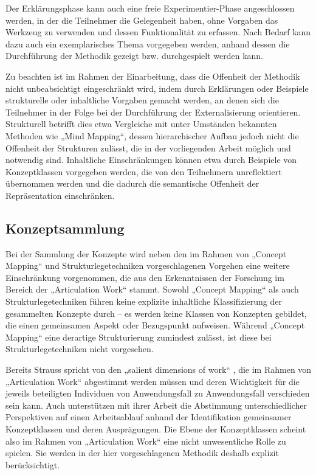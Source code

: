 Der Erklärungsphase kann auch eine freie Experimentier-Phase angeschlossen werden, in der die Teilnehmer die Gelegenheit haben, ohne Vorgaben das Werkzeug zu verwenden und dessen Funktionalität zu erfassen. Nach Bedarf kann dazu auch ein exemplarisches Thema vorgegeben werden, anhand dessen die Durchführung der Methodik gezeigt bzw. durchgespielt werden kann.

Zu beachten ist im Rahmen der Einarbeitung, dass die Offenheit der Methodik nicht unbeabsichtigt eingeschränkt wird, indem durch Erklärungen oder Beispiele strukturelle oder inhaltliche Vorgaben gemacht werden, an denen sich die Teilnehmer in der Folge bei der Durchführung der Externalisierung orientieren. Strukturell betrifft dies etwa Vergleiche mit unter Umständen bekannten Methoden wie „Mind Mapping“, dessen hierarchischer Aufbau jedoch nicht die Offenheit der Strukturen zulässt, die in der vorliegenden Arbeit möglich und notwendig sind. Inhaltliche Einschränkungen können etwa durch Beispiele von Konzeptklassen vorgegeben werden, die von den Teilnehmern unreflektiert übernommen werden und die dadurch die semantische Offenheit der Repräsentation einschränken.

\subsection{Konzeptsammlung}

Bei der Sammlung der Konzepte wird neben den im Rahmen von „Concept Mapping“ und Strukturlegetechniken vorgeschlagenen Vorgehen eine weitere Einschränkung vorgenommen, die aus den Erkenntnissen der Forschung im Bereich der „Articulation Work“ stammt. Sowohl „Concept Mapping“ als auch Strukturlegetechniken führen keine explizite inhaltliche Klassifizierung der gesammelten Konzepte durch -- es werden keine Klassen von Konzepten gebildet, die einen gemeinsamen Aspekt oder Bezugspunkt aufweisen. Während „Concept Mapping“ eine derartige Strukturierung zumindest zulässt, ist diese bei Strukturlegetechniken nicht vorgesehen.

Bereits Strauss spricht von den „salient dimensions of work“ \citep[][S.5]{Fjuk97}, die im Rahmen von „Articulation Work“ abgestimmt werden müssen und deren Wichtigkeit für die jeweils beteiligten Individuen von Anwendungsfall zu Anwendungsfall verschieden sein kann. Auch \citet{Sarini02} unterstützen mit ihrer Arbeit die Abstimmung unterschiedlicher Perspektiven auf einen Arbeitsablauf anhand der Identifikation gemeinsamer Konzeptklassen und deren Ausprägungen. Die Ebene der Konzeptklassen scheint also im Rahmen von „Articulation Work“ eine nicht unwesentliche Rolle zu spielen. Sie werden in der hier vorgeschlagenen Methodik deshalb explizit berücksichtigt. 

